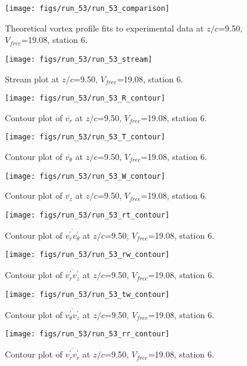 \begin{figure}[H]
\centering
\texttt{[image: figs/run\_53/run\_53\_comparison]}
\caption{Theoretical vortex profile fits to experimental data at $z/c$=9.50, $V_{free}$=19.08, station 6.}
\end{figure}


\begin{figure}[H]
\centering
\texttt{[image: figs/run\_53/run\_53\_stream]}
\caption{Stream plot at $z/c$=9.50, $V_{free}$=19.08, station 6.}
\end{figure}


\begin{figure}[H]
\centering
\texttt{[image: figs/run\_53/run\_53\_R\_contour]}
\caption{Contour plot of $\overline{v_{r}}$ at $z/c$=9.50, $V_{free}$=19.08, station 6.}
\end{figure}


\begin{figure}[H]
\centering
\texttt{[image: figs/run\_53/run\_53\_T\_contour]}
\caption{Contour plot of $\overline{v_{\theta}}$ at $z/c$=9.50, $V_{free}$=19.08, station 6.}
\end{figure}


\begin{figure}[H]
\centering
\texttt{[image: figs/run\_53/run\_53\_W\_contour]}
\caption{Contour plot of $\overline{v_{z}}$ at $z/c$=9.50, $V_{free}$=19.08, station 6.}
\end{figure}


\begin{figure}[H]
\centering
\texttt{[image: figs/run\_53/run\_53\_rt\_contour]}
\caption{Contour plot of $\overline{v_{r}^{\prime} v_{\theta}^{\prime}}$ at $z/c$=9.50, $V_{free}$=19.08, station 6.}
\end{figure}


\begin{figure}[H]
\centering
\texttt{[image: figs/run\_53/run\_53\_rw\_contour]}
\caption{Contour plot of $\overline{v_{r}^{\prime} v_{z}^{\prime}}$ at $z/c$=9.50, $V_{free}$=19.08, station 6.}
\end{figure}


\begin{figure}[H]
\centering
\texttt{[image: figs/run\_53/run\_53\_tw\_contour]}
\caption{Contour plot of $\overline{v_{\theta}^{\prime} v_{z}^{\prime}}$ at $z/c$=9.50, $V_{free}$=19.08, station 6.}
\end{figure}


\begin{figure}[H]
\centering
\texttt{[image: figs/run\_53/run\_53\_rr\_contour]}
\caption{Contour plot of $\overline{v_{r}^{\prime} v_{r}^{\prime}}$ at $z/c$=9.50, $V_{free}$=19.08, station 6.}
\end{figure}


